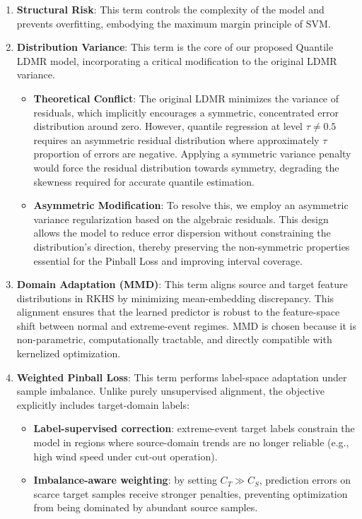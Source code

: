 \documentclass[a4paper]{cas-sc}
\begin{document}
\begin{enumerate}
    \item \textbf{Structural Risk}: This term controls the complexity of the model and prevents overfitting, embodying the maximum margin principle of SVM.
    \item \textbf{Distribution Variance}: This term is the core of our proposed Quantile LDMR model, incorporating a critical modification to the original LDMR variance.
    \begin{itemize}
        \item \textbf{Theoretical Conflict}: The original LDMR minimizes the variance of residuals, which implicitly encourages a symmetric, concentrated error distribution around zero. However, quantile regression at level $\tau \neq 0.5$ requires an asymmetric residual distribution where approximately $\tau$ proportion of errors are negative. Applying a symmetric variance penalty would force the residual distribution towards symmetry, degrading the skewness required for accurate quantile estimation.
        \item \textbf{Asymmetric Modification}: To resolve this, we employ an asymmetric variance regularization based on the algebraic residuals. This design allows the model to reduce error dispersion without constraining the distribution's direction, thereby preserving the non-symmetric properties essential for the Pinball Loss and improving interval coverage.
    \end{itemize}
    \item \textbf{Domain Adaptation (MMD)}: This term aligns source and target feature distributions in RKHS by minimizing mean-embedding discrepancy. This alignment ensures that the learned predictor is robust to the feature-space shift between normal and extreme-event regimes. MMD is chosen because it is non-parametric, computationally tractable, and directly compatible with kernelized optimization.
    \item \textbf{Weighted Pinball Loss}: This term performs label-space adaptation under sample imbalance. Unlike purely unsupervised alignment, the objective explicitly includes target-domain labels:
    \begin{itemize}
        \item \textbf{Label-supervised correction}: extreme-event target labels constrain the model in regions where source-domain trends are no longer reliable (e.g., high wind speed under cut-out operation).
        \item \textbf{Imbalance-aware weighting}: by setting $C_T \gg C_S$, prediction errors on scarce target samples receive stronger penalties, preventing optimization from being dominated by abundant source samples.
    \end{itemize}
\end{enumerate}
\end{document}
